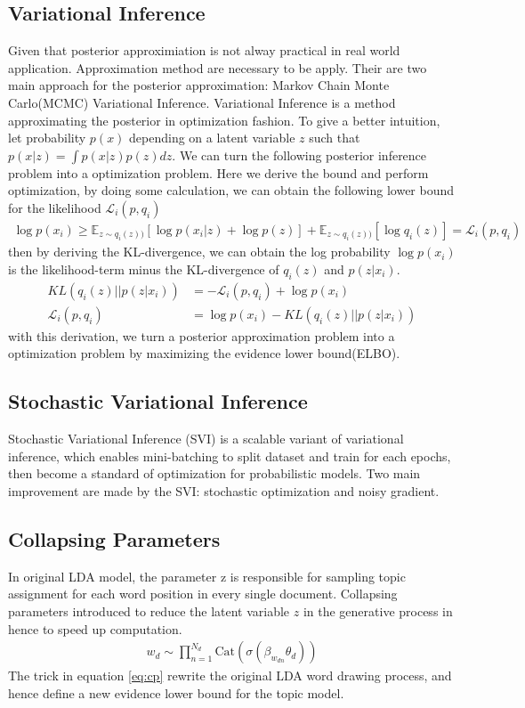 \subsection{Variational Inference}
Given that posterior approximiation is not alway practical in real world application. Approximation method are necessary to be apply. Their are two main approach for the posterior approximation: Markov Chain Monte Carlo(MCMC) Variational Inference. Variational Inference is a method approximating the posterior in optimization fashion. To give a better intuition, let probability $ p(x) $ depending on a latent variable $ z $ such that $ p(x|z)=\int p(x|z)p(z)dz $. We can turn the following posterior inference problem into a optimization problem. Here we derive the bound and perform optimization, by doing some calculation, we can obtain the following lower bound for the likelihood $ \mathcal{L}_i(p,q_i) $
\begin{align}
\log p(x_i)\geq\mathbb{E}_{z\sim q_i(z))}[\log p(x_i|z)+\log p(z)]+\mathbb{E}_{z\sim q_i(z))}[\log q_i(z)]=\mathcal{L}_i(p,q_i)
\end{align}
then by deriving the KL-divergence, we can obtain the log probability $ \log p(x_i) $ is the likelihood-term minus the KL-divergence of $ q_i(z) $ and $ p(z|x_i) $.
\begin{align}
KL(q_i(z)||p(z|x_i))&=-\mathcal{L}_i(p,q_i)+\log p(x_i)\\
\mathcal{L}_i(p,q_i)&=\log p(x_i)-KL(q_i(z)||p(z|x_i))
\end{align}
with this derivation, we turn a posterior approximation problem into a optimization problem by maximizing the evidence lower bound(ELBO).
\subsection{Stochastic Variational Inference}
Stochastic Variational Inference (SVI)\cite{hoffman_stochastic_2013} is a scalable variant of variational inference, which enables mini-batching to split dataset and train for each epochs, then become a standard of optimization for probabilistic models.
Two main improvement are made by the SVI: stochastic optimization and noisy gradient.
\subsection{Collapsing Parameters}
In original LDA model, the parameter z is responsible for sampling topic assignment for each word position in every single document. Collapsing parameters\cite{srivastava_autoencoding_2017} introduced to reduce the latent variable $ z $ in the generative process in hence to speed up computation.
\begin{align}\label{eq:cp}
w_d\sim\prod_{n=1}^{N_d}\text{Cat}(\sigma(\beta_{w_{dn}}\theta_d))
\end{align}
The trick in equation \ref{eq:cp} rewrite the original LDA word drawing process, and hence define a new evidence lower bound for the topic model.

